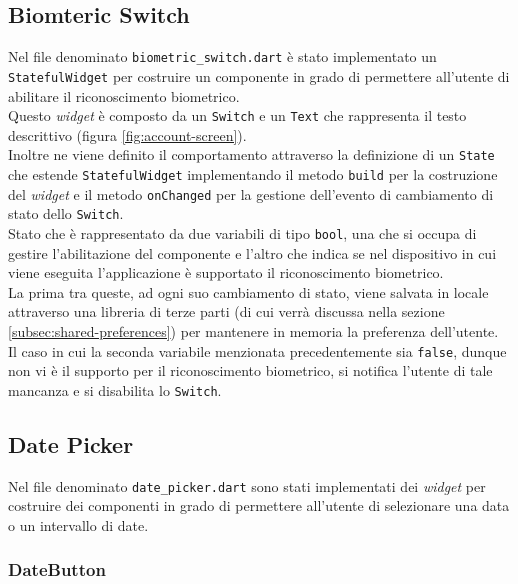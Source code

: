 \subsection{Biomteric Switch}
\label{subsec:biometric-switch}

Nel file denominato \lstinline{biometric_switch.dart} è stato implementato un \lstinline{StatefulWidget} per costruire un componente in grado di permettere all'utente di abilitare il riconoscimento biometrico. \\
Questo \emph{widget} è composto da un \lstinline{Switch}\cite{site:switch} e un \lstinline{Text}\cite{site:text} che rappresenta il testo descrittivo (figura \ref{fig:account-screen}).\\
Inoltre ne viene definito il comportamento attraverso la definizione di un \lstinline{State} che estende \lstinline{StatefulWidget} implementando il metodo \lstinline{build} per la costruzione del \emph{widget} e il metodo \lstinline{onChanged} per la gestione dell'evento di cambiamento di stato dello \lstinline{Switch}.\\
Stato che è rappresentato da due variabili di tipo \lstinline{bool}, una che si occupa di gestire l'abilitazione del componente e l'altro che indica se nel dispositivo in cui viene eseguita l'applicazione è supportato il riconoscimento biometrico.\\
La prima tra queste, ad ogni suo cambiamento di stato, viene salvata in locale attraverso una libreria di terze parti (di cui verrà discussa nella sezione \ref{subsec:shared-preferences}) per mantenere in memoria la preferenza dell'utente. \\
Il caso in cui la seconda variabile menzionata precedentemente sia \lstinline{false}, dunque non vi è il supporto per il riconoscimento biometrico, si notifica l'utente di tale mancanza e si disabilita lo \lstinline{Switch}.

\subsection{Date Picker}
\label{subsec:date-picker}

Nel file denominato \lstinline{date_picker.dart} sono stati implementati dei \emph{widget} per costruire dei componenti in grado di permettere all'utente di selezionare una data o un intervallo di date.

\subsubsection*{DateButton}
\label{subsubsec:date-button}

